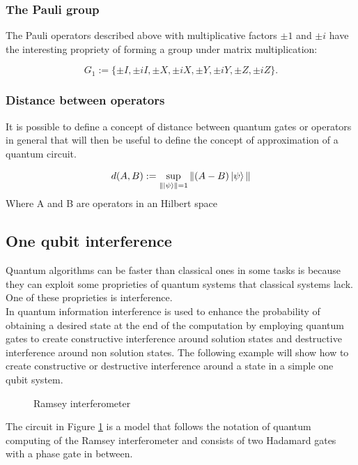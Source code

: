 \documentclass{article}
\begin{document}
\subsubsection{The Pauli group}
The Pauli operators described above with multiplicative factors $\pm 1$ and $\pm i$ have the
interesting propriety of forming a group under matrix multiplication:

\begin{equation}
	G_1 := \{\pm I, \pm iI, \pm X, \pm iX, \pm Y, \pm iY, \pm Z, \pm iZ\}.
	\label{pauligrup}
\end{equation}


\subsubsection{Distance between operators}
It is possible to define a concept of distance between quantum gates or operators
in general that will then be useful to define the concept of approximation of a
quantum circuit.

\begin{equation}
	d(A,B) := \sup_{\| \ket{\psi}\|=1} \|(A-B)\ket{\psi}\|
	\label{distance}
\end{equation}
Where A and B are operators in an Hilbert space

\subsection{One qubit interference}


Quantum algorithms can be faster than classical ones
in some tasks is because they can exploit some proprieties of quantum
systems that classical systems lack.
One of these proprieties is interference.\\
In quantum information interference is used to enhance the probability of
obtaining a desired state at the end of the computation by employing quantum gates
to create constructive interference around solution states and destructive
interference around non solution states.
The following example will show how to create constructive or destructive interference
around a state in a simple one qubit system.
\vspace{10pt}
\begin{figure}[H]
	\centering
	\caption{Ramsey interferometer}
	\label{interference}
\end{figure}
\vspace{10pt}
\noindent The circuit in Figure \ref{interference} is a model
that follows the notation of quantum computing of the Ramsey interferometer and consists of
two Hadamard gates with a phase gate in between.\\
\end{document}
